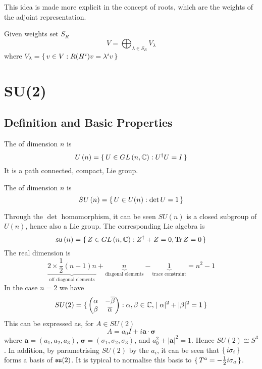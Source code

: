 \documentclass{article}
\begin{document}
\begin{idea}
	This idea is made more explicit in the concept of roots, which are the weights of the adjoint representation. 
\end{idea}

\begin{fact}
	Given weights set $S_R$
	\[
	V=\bigoplus_{\lambda\in S_R} V_\lambda
	\]
	where $V_\lambda=\set{ v\in V : R(H^i)v=\lambda^i v}$
\end{fact}

\section{SU(2)}
\subsection{Definition and Basic Properties}

\begin{definition}[U($n$)]
	The  of dimension $n$ is 
	\[
	U\left(n\right)=\set{  U\in GL\left(n,\mathbb{C}\right) : U^\dagger U=I  }
	\]
	It is a path connected, compact, Lie group.
\end{definition}

\begin{definition}[SU($n$)]
	The  of dimension $n$ is
	\[
	SU\left(n\right)=\set{  U\in U(n) : \det{U}=1  }
	\]
\end{definition}
\noindent Through the $\det$ homomorphism, it can be seen $SU(n)$ is a closed subgroup of $U(n)$, hence also a Lie group.  The corresponding Lie algebra is 
\[
\mathfrak{su}\left(n\right)=\set{  Z\in GL\left(n,\mathbb{C}\right) : Z^\dagger+Z=0, \operatorname{Tr}{Z}=0  }
\]
The real dimension is
\[
\underbrace{2\times\frac{1}{2}(n-1)n}_{\text{off diagonal elements}}+\underbrace{n}_{\text{diagonal elements}}-\underbrace{1}_{\text{trace constraint}}=n^2-1
\]
In the case $n=2$ we have 
\[
SU(2)=\set{    \begin{pmatrix} \alpha & -\overline{\beta} \\ \beta & \overline{\alpha} \end{pmatrix}  : \alpha,\beta\in\mathbb{C} , |\alpha|^2+|\beta|^2=1   }
\]
This can be expressed as, for $A\in SU(2)$
\[
A=a_0 I +i\bm{a}\cdot\bm{\sigma}
\]
where $\bm{a}=(a_1, a_2, a_3)$, $\bm{\sigma}=(\sigma_1, \sigma_2, \sigma_3)$, and $a_0^2+|\bm{a}|^2=1$. Hence $SU(2)\cong S^3$. In addition, by parametrising $SU(2)$ by the $a_i$, it can be seen that $\set{  i\sigma_i }$ forms a basis of $\mathfrak{su}(2)$. It is typical to normalise this basis to $\set{  T^a=-\frac{1}{2} i\sigma_a  }$. 
\end{document}
